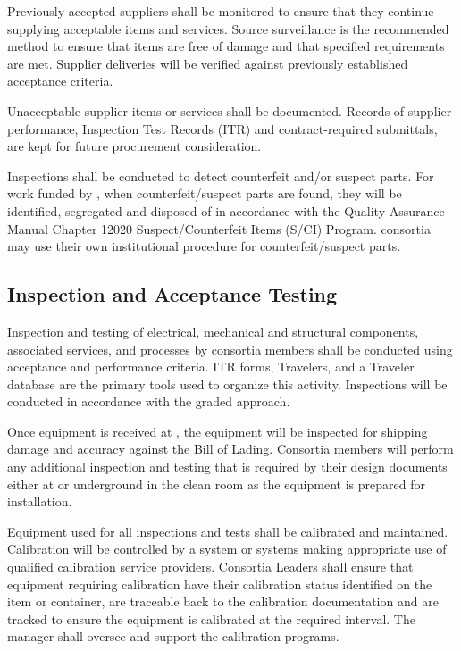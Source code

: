 Previously accepted suppliers shall be monitored to ensure that they
continue supplying acceptable items and services. Source surveillance
is the recommended method to ensure that items are free of damage and
that specified requirements are met. Supplier deliveries will be
verified against previously established acceptance criteria.

Unacceptable supplier items or services shall be documented. Records
of supplier performance, Inspection Test Records (ITR) and
contract-required submittals, are kept for future procurement
consideration.

Inspections shall be conducted to detect counterfeit and/or suspect
parts. For work funded by , when counterfeit/suspect parts
are found, they will be identified, segregated and disposed of in
accordance with the \fnal Quality Assurance Manual Chapter 12020
Suspect/Counterfeit Items (S/CI) Program.  consortia may
use their own institutional procedure for counterfeit/suspect parts.

\subsection{Inspection and Acceptance Testing}

Inspection and testing of electrical, mechanical and structural
components, associated services, and processes by consortia members
shall be conducted using acceptance and performance criteria. ITR
forms, Travelers, and a Traveler database are the primary tools used
to organize this activity. Inspections will be conducted in accordance
with the graded approach.

Once equipment is received at , the equipment will 
be inspected for shipping damage and accuracy against the Bill of Lading. 
Consortia members will perform any additional inspection and testing that 
is required by their design documents either at  or 
underground in the clean room as the equipment is prepared for 
installation.

Equipment used for all inspections and tests shall be calibrated and
maintained. Calibration will be controlled by a system or systems
making appropriate use of qualified calibration service
providers. Consortia Leaders shall ensure that equipment requiring
calibration have their calibration status identified on the item or
container, are traceable back to the calibration documentation and are
tracked to ensure the equipment is calibrated at the required
interval. The   manager shall
oversee and support the  calibration programs.

